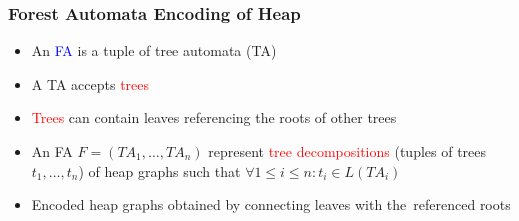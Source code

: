 \documentclass{beamer}
\newenvironment{figure*}%
{\begin{figure}}
{\end{figure}}
\newcommand{\hlbl}[1]{\textcolor{blue}{#1}}
\newcommand{\hlgr}[1]{\textcolor{olive!50!green}{#1}}
\newcommand{\hlrd}[1]{\textcolor{red}{#1}}
\newcommand{\hlye}[1]{\textcolor{magenta}{#1}}
\begin{document}
\begin{frame}
\frametitle{Forest Automata Encoding of Heap}

	\begin{itemize}
			\item An \hlbl{FA} is a tuple of \hlgr{tree automata (TA)}
				\pause
			\item A \hlgr{TA} accepts \hlrd{trees}
				\pause
			\item \hlrd{Trees} can contain leaves referencing the roots of other trees
				\pause
			\item An FA $F=(TA_1,\ldots,TA_n)$ represent \hlrd{tree decompositions} (tuples of trees $t_1,\ldots,t_n$) of heap graphs
				such that $\forall 1 \leq i \leq n: t_i \in L(TA_i)$
				\pause
			\item Encoded heap graphs obtained by connecting leaves with the~referenced roots
	\end{itemize}

	\begin{center}
	\begin{figure}
		\begin{subfigure}{0.5\textwidth}
			\centering
			
		\end{subfigure}%
		\hspace{-0.3cm}
		\begin{subfigure}{0.5\textwidth}
			\centering
			
		\end{subfigure}
	\end{figure}
	\end{center}

\end{frame}

\end{document}
